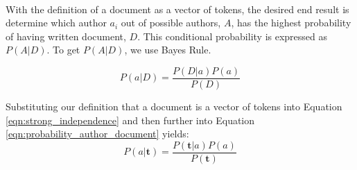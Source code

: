 		\paragraph{} With the definition of a document as a vector of tokens, the desired end result is determine which author $a_i$ out of possible authors, $A$, has the highest probability of having written document, $D$.  This conditional probability is expressed as $P(A|D)$.  To get $P(A|D)$, we use Bayes Rule.  \begin{comment} Using variables $A$ and $D$ to express Bayes Rule, we begin with the realization that the probability we are seeking is the probability that both $A$ and $D$ are true.  This probability can be expressed as $P(A \land B)$.  Using the probability product rule, $P(A \land B)$ can be expressed as:
		\begin{equation} \label{eqn:product-rule_1} P(A \land D) = P(A|D) P(D) \end{equation}
		\begin{equation} \label{eqn:product-rule_2}P(A \land D) = P(D|A) P(A) \end{equation}
		
		Using equations \ref{eqn:product-rule_1} and \ref{eqn:product-rule_2}, we get:
		\begin{equation} P(A|D) P(D) = P(D|A) P(A)\end{equation}
		Solving for $P(A|D)$ we get:\end{comment}
		
		\begin{equation} \label{eqn:probability_author_document} P(a|D) = \frac{P(D|a) P(a)}{P(D)} \end{equation}
		
		\begin{comment}
		At this point, we use our definition of a document, as a vector of tokens, and a strong conditional independence assumption.  The strong conditional independence assumption states that when a single effect, $E$, results from multiple causes, $c_i$ in $C$, for $ 0 \le i \le n $, where there is no probability relationship between any $c_i$ in $C$: 
		\begin{equation} \label{eqn:strong_independence} P(E|C) = P(E|c_i) = \prod_i^n P(E|c_i) \end{equation}
		\end{comment}
		
		Substituting our definition that a document is a vector of tokens into Equation \ref{eqn:strong_independence} and then further into Equation \ref{eqn:probability_author_document} yields:
		\begin{equation} P(a|\mathbf{t}) = \frac{P(\mathbf{t}|a) P(a)}{P(\mathbf{t})} \end{equation}
		
